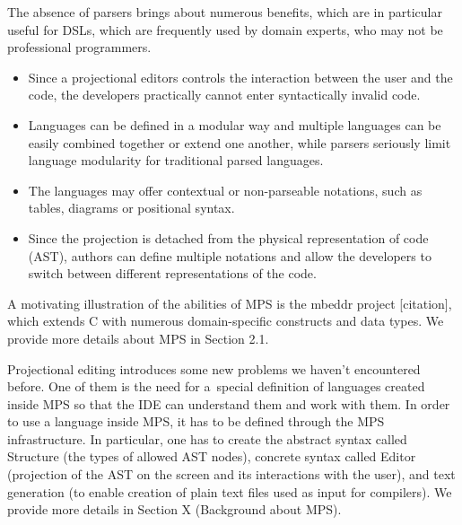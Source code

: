  The absence of parsers brings about numerous benefits, which are in particular useful for DSLs, which are frequently used by domain experts, who may not be professional programmers.
\begin{itemize}
	\item Since a projectional editors controls the interaction between the user and the code, the developers practically cannot enter syntactically invalid code.
	\item Languages can be defined in a modular way and multiple languages can be easily combined together or extend one another, while parsers seriously limit language modularity for traditional parsed languages.
	\item The languages may offer contextual or non-parseable notations, such as tables, diagrams or positional syntax.
	\item Since the projection is detached from the physical representation of code (AST), authors can define multiple notations and allow the developers to switch between different representations of the code.
\end{itemize}
A motivating illustration of the abilities of MPS is the mbeddr project [citation], which extends C with numerous domain-specific constructs and data types.
We provide more details about MPS in Section 2.1.



 Projectional editing introduces some new problems we haven't encountered before. One of them is the need for a~special definition of languages created inside MPS so that the IDE can understand them and work with them. In order to use a language inside MPS, it has to be defined through the MPS infrastructure. In particular, one has to create the abstract syntax called Structure (the types of allowed AST nodes), concrete syntax called Editor (projection of the AST on the screen and its interactions with the user), and text generation (to enable creation of plain text files used as input for compilers). We provide more details in Section X (Background about MPS).

